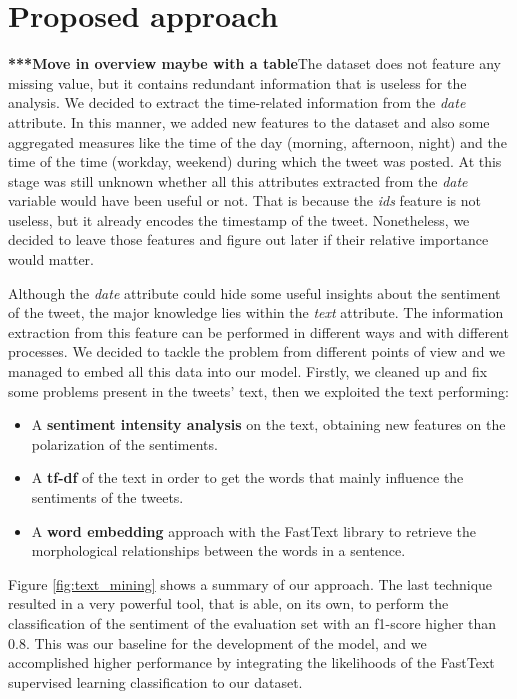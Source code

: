 \documentclass[conference]{IEEEtran}
\begin{document}
\section{Proposed approach}\label{sec:approach}
\textbf{***Move in overview maybe with a table}The dataset does not feature any missing value, but it contains redundant information that is useless for the analysis. We decided to extract the time-related information from the \textit{date} attribute. In this manner, we added new features to the dataset and also some aggregated measures like the time of the day (morning, afternoon, night) and the time of the time (workday, weekend) during which the tweet was posted. At this stage was still unknown whether all this attributes extracted from the \textit{date} variable would have been useful or not. That is because the \textit{ids} feature is not useless, but it already encodes the timestamp of the tweet. Nonetheless, we decided to leave those features and figure out later if their relative importance would matter.

Although the \textit{date} attribute could hide some useful insights about the sentiment of the tweet, the major knowledge lies within the \textit{text} attribute. The information extraction from this feature can be performed in different ways and with different processes. We decided to tackle the problem from different points of view and we managed to embed all this data into our model. Firstly, we cleaned up and fix some problems present in the tweets' text, then we exploited the text performing:
\begin{itemize}
    \item A \textbf{sentiment intensity analysis}\cite{} on the text, obtaining new features on the polarization of the sentiments.
    \item A \textbf{tf-df}\cite{} of the text in order to get the words that mainly influence the sentiments of the tweets.
    \item A \textbf{word embedding}\cite{} approach with the FastText\cite{} library to retrieve the morphological relationships between the words in a sentence.
\end{itemize}
Figure \ref{fig:text_mining} shows a summary of our approach.
The last technique resulted in a very powerful tool, that is able, on its own, to perform the classification of the sentiment of the evaluation set with an f1-score\cite{f1} higher than 0.8. This was our baseline for the development of the model, and we accomplished higher performance by integrating the likelihoods of the FastText supervised learning classification to our dataset. 
\end{document}
